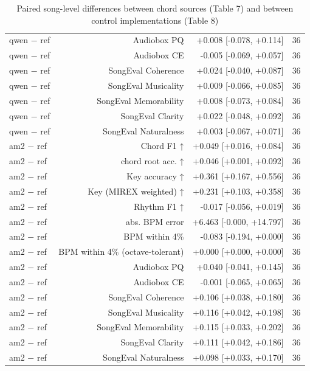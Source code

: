 \begin{table}[t]
\begin{tabular}{lrrr}
qwen $-$ ref & Audiobox PQ & +0.008 [-0.078, +0.114] & 36 \\
qwen $-$ ref & Audiobox CE & -0.005 [-0.069, +0.057] & 36 \\
qwen $-$ ref & SongEval Coherence & +0.024 [-0.040, +0.087] & 36 \\
qwen $-$ ref & SongEval Musicality & +0.009 [-0.066, +0.085] & 36 \\
qwen $-$ ref & SongEval Memorability & +0.008 [-0.073, +0.084] & 36 \\
qwen $-$ ref & SongEval Clarity & +0.022 [-0.048, +0.092] & 36 \\
qwen $-$ ref & SongEval Naturalness & +0.003 [-0.067, +0.071] & 36 \\
am2 $-$ ref & Chord F1 ↑ & +0.049 [+0.016, +0.084] & 36 \\
am2 $-$ ref & chord root acc. ↑ & +0.046 [+0.001, +0.092] & 36 \\
am2 $-$ ref & Key accuracy ↑ & +0.361 [+0.167, +0.556] & 36 \\
am2 $-$ ref & Key (MIREX weighted) ↑ & +0.231 [+0.103, +0.358] & 36 \\
am2 $-$ ref & Rhythm F1 ↑ & -0.017 [-0.056, +0.019] & 36 \\
am2 $-$ ref & abs. BPM error & +6.463 [-0.000, +14.797] & 36 \\
am2 $-$ ref & BPM within 4\% & -0.083 [-0.194, +0.000] & 36 \\
am2 $-$ ref & BPM within 4\% (octave-tolerant) & +0.000 [+0.000, +0.000] & 36 \\
am2 $-$ ref & Audiobox PQ & +0.040 [-0.041, +0.145] & 36 \\
am2 $-$ ref & Audiobox CE & -0.001 [-0.065, +0.065] & 36 \\
am2 $-$ ref & SongEval Coherence & +0.106 [+0.038, +0.180] & 36 \\
am2 $-$ ref & SongEval Musicality & +0.116 [+0.042, +0.198] & 36 \\
am2 $-$ ref & SongEval Memorability & +0.115 [+0.033, +0.202] & 36 \\
am2 $-$ ref & SongEval Clarity & +0.111 [+0.042, +0.186] & 36 \\
am2 $-$ ref & SongEval Naturalness & +0.098 [+0.033, +0.170] & 36 \\
\bottomrule
\end{tabular}
\caption{Paired song-level differences between chord sources (Table 7) and between control implementations (Table 8)}
\label{tab:backing_paired_sa3}
\end{table}
